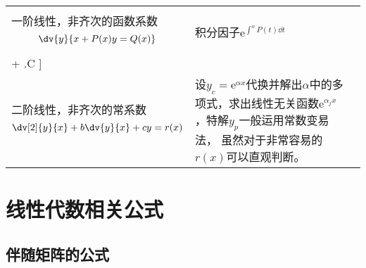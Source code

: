 \begin{fullpage}
\begin{tabularx}{\textwidth}{@{}XXX@{}}
        \midrule
        \rowcolor{gray!40}
        \multicolumn{3}{c}{线性方程}                                                                                                                                                                                                                                                                                                                       \\
        一阶线性，非齐次的函数系数\[ \dv{y}{x + P(x)y = Q(x)} \]                                       & 积分因子$\mathrm{e}^{\int^x P(t)\dd{t}}$                                                                                                                                   &
        \[\begin{split} y = \mathrm{e}^{-\int^x P(s)\dd{s}}\left[\int^x \mathrm{e}^{\int^t P(m)\dd{m}}Q(t)\dd{t}\right.\\ + \left.C \vphantom{\int^x}\right]\end{split} \]                                                                                                                                                                                                                                                                                                                    \\
        \midrule
        二阶线性，非齐次的常系数\[ \dv[2]{y}{x}+b\dv{y}{x} + cy = r(x) \]                              & 设$y_c=\mathrm{e}^{\alpha x}$代换并解出$\alpha$中的多项式，求出线性无关函数$\mathrm{e}^{\alpha_j x}$，特解$y_p$一般运用常数变易法， 虽然对于非常容易的$r(x)$可以直观判断。 &                                                                      \\
        \bottomrule
    \end{tabularx}
\end{fullpage}

\section{线性代数相关公式}
\subsection{伴随矩阵的公式}\label{sec:伴随矩阵的公式}

